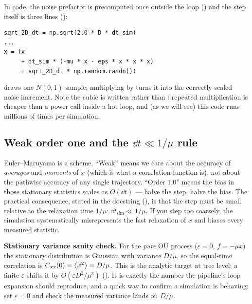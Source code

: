 In code, the noise prefactor is precomputed once outside the loop
() and the step itself is three lines
():

\begin{lstlisting}
sqrt_2D_dt = np.sqrt(2.0 * D * dt_sim)
...
x = (x
     + dt_sim * (-mu * x - eps * x * x * x)
     + sqrt_2D_dt * np.random.randn())
\end{lstlisting}

 draws one $N(0,1)$ sample; multiplying by
 turns it into the correctly-scaled noise increment. Note the
cubic is written  rather than : repeated
multiplication is cheaper than a power call inside a hot loop, and (as we will see)
this code runs millions of times per simulation.

\subsection{Weak order one and the $\dd t \ll 1/\mu$ rule}

Euler--Maruyama is a  scheme. ``Weak'' means we care about the
accuracy of \emph{averages} and \emph{moments} of $x$ (which is what a correlation
function is), not about the pathwise accuracy of any single trajectory. ``Order
$1.0$'' means the bias in those stationary statistics scales as $O(\dd t)$ ---
halve the step, halve the bias. The practical consequence, stated in the docstring
(), is that the step must be small relative to
the relaxation time $1/\mu$: $\dd t_{\mathrm{sim}} \ll 1/\mu$. If you step too
coarsely, the simulation systematically misrepresents the fast relaxation of $x$
and biases every measured statistic.

\begin{defn}
\textbf{Stationary variance sanity check.} For the \emph{pure} OU process
($\varepsilon = 0$, $f = -\mu x$) the stationary distribution is Gaussian with
variance $D/\mu$, so the equal-time correlation is $C_{xx}(0) = \left\langle x^{2} \right\rangle =
D/\mu$. This is the analytic target at tree level; a finite $\varepsilon$ shifts it
by $O(\varepsilon D^{2}/\mu^{3})$ (). It is
exactly the number the pipeline's loop expansion should reproduce, and a quick way
to confirm a simulation is behaving: set $\varepsilon = 0$ and check the measured
variance lands on $D/\mu$.
\end{defn}

